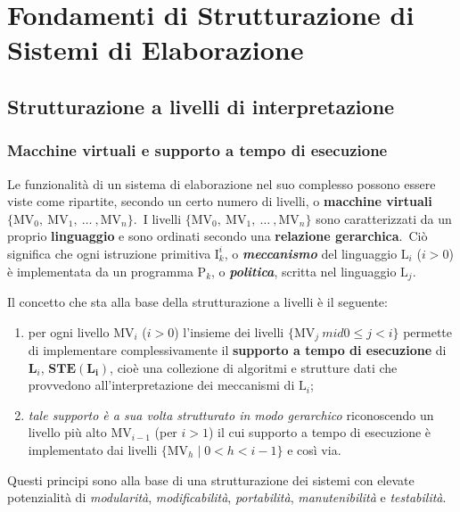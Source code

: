\chapter{Fondamenti di Strutturazione di Sistemi di Elaborazione}

\section{Strutturazione a livelli di interpretazione}

\subsection{Macchine virtuali e supporto a tempo di esecuzione}

Le funzionalità di un sistema di elaborazione nel suo complesso possono essere viste come ripartite, secondo un certo numero di livelli, o \textbf{macchine virtuali} $\{\mathrm{MV}_0,\ \mathrm{MV}_1,\ \dots\ , \mathrm{MV}_n\}$.\
I livelli $\{\mathrm{MV}_0,\ \mathrm{MV}_1,\ \dots\ , \mathrm{MV}_n\}$ sono caratterizzati da un proprio \textbf{linguaggio} e sono ordinati secondo una \textbf{relazione gerarchica}.\
Ciò significa che ogni istruzione primitiva $\mathrm{I}_k^i$, o \textbf{\textit{meccanismo}} del linguaggio $\mathrm{L}_i$ ($i>0$) è implementata da un programma $\mathrm{P}_k$, o \textbf{\textit{politica}}, scritta nel linguaggio $\mathrm{L}_j$.

Il concetto che sta alla base della strutturazione a livelli è il seguente:

\begin{enumerate}
    \item per ogni livello $\mathrm{MV}_i$ ($i>0$) l'insieme dei livelli $\{\mathrm{MV}_j\ mid  0 \leq j < i\}$ permette di implementare complessivamente il \textbf{supporto a tempo di esecuzione} di $\mathbf{L}_i$, $\mathbf{STE(L_i)}$, cioè una collezione di algoritmi e strutture dati che provvedono all'interpretazione dei meccanismi di $\mathrm{L}_i$;
    \item \textit{tale supporto è a sua volta strutturato in modo gerarchico} riconoscendo un livello più alto $\mathrm{MV}_{i-1}$ (per $i>1$) il cui supporto a tempo di esecuzione è implementato dai livelli $\{\mathrm{MV}_h \mid 0 < h < i-1\}$ e così via.
\end{enumerate}

\noindent Questi principi sono alla base di una strutturazione dei sistemi con elevate potenzialità di \textit{modularità}, \textit{modificabilità}, \textit{portabilità}, \textit{manutenibilità} e \textit{testabilità}.

